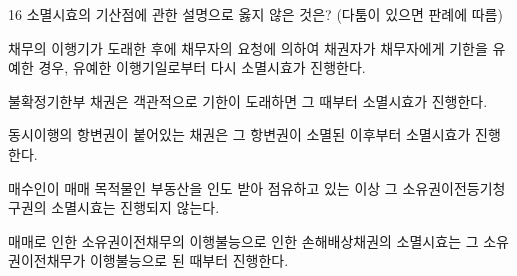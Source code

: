 \begin{question}{16}
소멸시효의 기산점에 관한 설명으로 옳지 않은 것은? (다툼이 있으면 판례에 따름)
\begin{choices}
  \item 채무의 이행기가 도래한 후에 채무자의 요청에 의하여 채권자가 채무자에게 기한을 유예한 경우, 유예한 이행기일로부터 다시 소멸시효가 진행한다.
  \item 불확정기한부 채권은 객관적으로 기한이 도래하면 그 때부터 소멸시효가 진행한다.
  \item 동시이행의 항변권이 붙어있는 채권은 그 항변권이 소멸된 이후부터 소멸시효가 진행한다.
  \item 매수인이 매매 목적물인 부동산을 인도 받아 점유하고 있는 이상 그 소유권이전등기청구권의 소멸시효는 진행되지 않는다.
  \item 매매로 인한 소유권이전채무의 이행불능으로 인한 손해배상채권의 소멸시효는 그 소유권이전채무가 이행불능으로 된 때부터 진행한다.
\end{choices}
\end{question}
